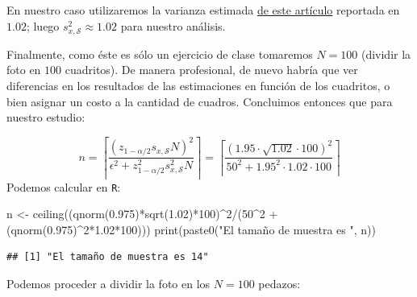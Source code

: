 \documentclass[
]{book}
\newenvironment{Shaded}{\begin{snugshade}}{\end{snugshade}}
\newcommand{\DecValTok}[1]{\textcolor[rgb]{0.00,0.00,0.81}{#1}}
\newcommand{\FloatTok}[1]{\textcolor[rgb]{0.00,0.00,0.81}{#1}}
\newcommand{\FunctionTok}[1]{\textcolor[rgb]{0.00,0.00,0.00}{#1}}
\newcommand{\NormalTok}[1]{#1}
\newcommand{\OtherTok}[1]{\textcolor[rgb]{0.56,0.35,0.01}{#1}}
\newcommand{\SpecialCharTok}[1]{\textcolor[rgb]{0.00,0.00,0.00}{#1}}
\newcommand{\StringTok}[1]{\textcolor[rgb]{0.31,0.60,0.02}{#1}}
\begin{document}
En nuestro caso utilizaremos la varianza estimada \href{https://arxiv.org/pdf/1903.07427.pdf}{de este artículo} reportada en \(1.02\); luego \(s^2_{x,\mathcal{S}} \approx 1.02\) para nuestro análisis.

Finalmente, como éste es sólo un ejercicio de clase tomaremos \(N = 100\) (dividir la foto en \(100\) cuadritos). De manera profesional, de nuevo habría que ver diferencias en los resultados de las estimaciones en función de los cuadritos, o bien asignar un costo a la cantidad de cuadros. Concluimos entonces que para nuestro estudio:

\[
n = \left\lceil \dfrac{(z_{1-\alpha/2} s_{x,\mathcal{S}} N)^2} {\epsilon^2 + z_{1-\alpha/2}^2 s^2_{x,\mathcal{S}} N}\right\rceil  = \left\lceil \dfrac{(1.95\cdot \sqrt{1.02} \cdot 100)^2} {50^2 + 1.95^2\cdot 1.02 \cdot 100}\right\rceil
\]
Podemos calcular en \texttt{R}:

\begin{Shaded}
\begin{Highlighting}[]
\NormalTok{n }\OtherTok{\textless{}{-}} \FunctionTok{ceiling}\NormalTok{((}\FunctionTok{qnorm}\NormalTok{(}\FloatTok{0.975}\NormalTok{)}\SpecialCharTok{*}\FunctionTok{sqrt}\NormalTok{(}\FloatTok{1.02}\NormalTok{)}\SpecialCharTok{*}\DecValTok{100}\NormalTok{)}\SpecialCharTok{\^{}}\DecValTok{2}\SpecialCharTok{/}\NormalTok{(}\DecValTok{50}\SpecialCharTok{\^{}}\DecValTok{2} \SpecialCharTok{+}\NormalTok{ (}\FunctionTok{qnorm}\NormalTok{(}\FloatTok{0.975}\NormalTok{)}\SpecialCharTok{\^{}}\DecValTok{2}\SpecialCharTok{*}\FloatTok{1.02}\SpecialCharTok{*}\DecValTok{100}\NormalTok{)))}
\FunctionTok{print}\NormalTok{(}\FunctionTok{paste0}\NormalTok{(}\StringTok{"El tamaño de muestra es "}\NormalTok{, n))}
\end{Highlighting}
\end{Shaded}

\begin{verbatim}
## [1] "El tamaño de muestra es 14"
\end{verbatim}

Podemos proceder a dividir la foto en los \(N = 100\) pedazos:
\end{document}
